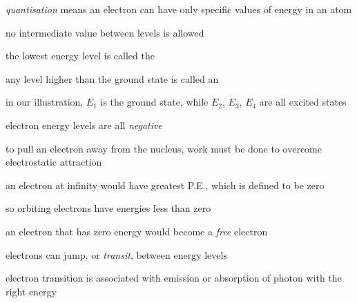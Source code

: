 \cmt \emph{quantisation} means an electron can have only specific values of energy in an atom

no intermediate value between levels is allowed

\cmt the lowest energy level is called the 

any level higher than the ground state is called an 

in our illustration, $E_1$ is the ground state, while $E_2$, $E_3$, $E_4$ are all excited states

\cmt electron energy levels are all \emph{negative}

to pull an electron away from the nucleus, work must be done to overcome electrostatic attraction

an electron at infinity would have greatest P.E., which is defined to be zero 

so orbiting electrons have energies less than zero

an electron that has zero energy would become a \emph{free} electron

\cmt electrons can jump, or \emph{transit}, between energy levels

electron transition is associated with emission or absorption of photon with the right energy



